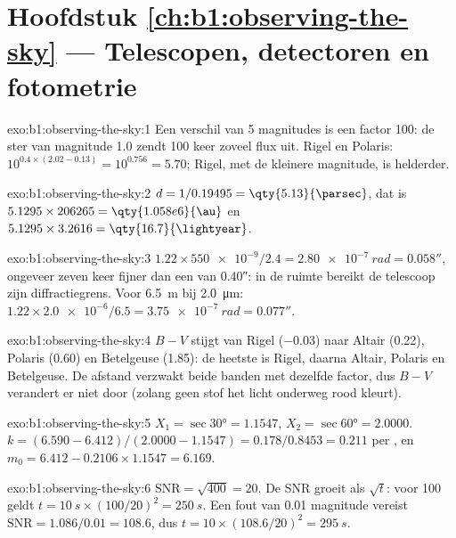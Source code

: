 \section*{Hoofdstuk \ref{ch:b1:observing-the-sky} --- Telescopen, detectoren en fotometrie}

\begin{solution}{exo:b1:observing-the-sky:1}
Een verschil van 5 magnitudes is een factor 100: de ster van magnitude 1.0 zendt
100 keer zoveel flux uit. Rigel en Polaris: $10^{0.4\times(2.02 - 0.13)} =
10^{0.756} = 5.70$; Rigel, met de kleinere magnitude, is helderder.
\end{solution}

\begin{solution}{exo:b1:observing-the-sky:2}
$d = 1/0.19495 = \qty{5.13}{\parsec}$, dat is $5.1295\times206265 =
\qty{1.058e6}{\au}$ en $5.1295\times3.2616 = \qty{16.7}{\lightyear}$.
\end{solution}

\begin{solution}{exo:b1:observing-the-sky:3}
$1.22\times\num{550e-9}/2.4 = \qty{2.80e-7}{rad} = \ang{;;0.058}$, ongeveer zeven keer
fijner dan een  van \ang{;;0.40}: in de ruimte bereikt de telescoop zijn
diffractiegrens. Voor \qty{6.5}{m} bij \qty{2.0}{\micro\metre}:
$1.22\times\num{2.0e-6}/6.5 = \qty{3.75e-7}{rad} = \ang{;;0.077}$.
\end{solution}

\begin{solution}{exo:b1:observing-the-sky:4}
$B - V$ stijgt van Rigel ($-0.03$) naar Altair (0.22), Polaris (0.60) en
Betelgeuse (1.85): de heetste is Rigel, daarna Altair, Polaris en Betelgeuse.
De afstand verzwakt beide banden met dezelfde factor, dus $B - V$ verandert er niet
door (zolang geen stof het licht onderweg rood kleurt).
\end{solution}

\begin{solution}{exo:b1:observing-the-sky:5}
$X_1 = \sec\ang{30} = 1.1547$, $X_2 = \sec\ang{60} = 2.0000$.
$k = (6.590 - 6.412)/(2.0000 - 1.1547) = 0.178/0.8453 = \num{0.211}$ per
, en $m_0 = 6.412 - 0.2106\times1.1547 = 6.169$.
\end{solution}

\begin{solution}{exo:b1:observing-the-sky:6}
$\mathrm{SNR} = \sqrt{400} = 20$. De SNR groeit als $\sqrt t$: voor 100 geldt
$t = \qty{10}{s}\times(100/20)^2 = \qty{250}{s}$. Een fout van \num{0.01}
magnitude vereist $\mathrm{SNR} = 1.086/0.01 = 108.6$, dus
$t = 10\times(108.6/20)^2 = \qty{295}{s}$.
\end{solution}

